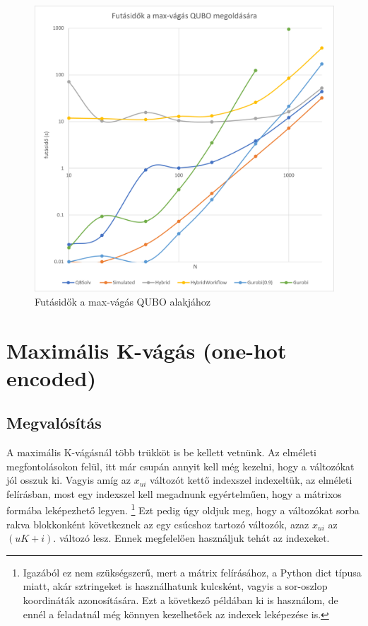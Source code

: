 \begin{figure}[!ht]
	\centering
	\includegraphics[width=150mm, keepaspectratio]{figures/diagrams/maxCutQUBO.png}
	\caption{Futásidők a max-vágás QUBO alakjához}
	\label{fig:maxCutQUBO}
\end{figure}

\section{Maximális K-vágás (one-hot encoded)}\label{sec:practiceOneHot}

\subsection{Megvalósítás}

A maximális K-vágásnál több trükköt is be kellett vetnünk. Az elméleti megfontolásokon felül, itt már csupán annyit kell még kezelni, hogy a változókat jól osszuk ki. Vagyis amíg az $x_{ui}$ változót kettő indexszel indexeltük, az elméleti felírásban, most egy indexszel kell megadnunk egyértelműen, hogy a mátrixos formába leképezhető legyen.
\footnote{Igazából ez nem szükségszerű, mert a mátrix felírásához, a Python dict típusa miatt, akár sztringeket is használhatunk kulcsként, vagyis a sor-oszlop koordináták azonosítására. Ezt a következő példában ki is használom, de ennél a feladatnál még könnyen kezelhetőek az indexek leképezése is.}
Ezt pedig úgy oldjuk meg, hogy a változókat sorba rakva blokkonként következnek az egy csúcshoz tartozó változók, azaz $x_{ui}$ az $(uK+i)$. változó lesz. Ennek megfelelően használjuk tehát az indexeket.


